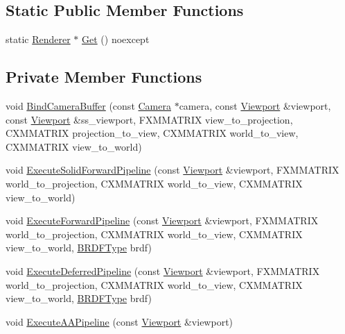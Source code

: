 \subsection*{Static Public Member Functions}
\begin{DoxyCompactItemize}
\item 
static \hyperlink{classmage_1_1_renderer}{Renderer} $\ast$ \hyperlink{classmage_1_1_renderer_a401f8e17f60d8546b30de22943ac35db}{Get} () noexcept
\end{DoxyCompactItemize}
\subsection*{Private Member Functions}
\begin{DoxyCompactItemize}
\item 
void \hyperlink{classmage_1_1_renderer_a7e303935e21196e28305cf4676128703}{Bind\+Camera\+Buffer} (const \hyperlink{classmage_1_1_camera}{Camera} $\ast$camera, const \hyperlink{classmage_1_1_viewport}{Viewport} \&viewport, const \hyperlink{classmage_1_1_viewport}{Viewport} \&ss\+\_\+viewport, F\+X\+M\+M\+A\+T\+R\+IX view\+\_\+to\+\_\+projection, C\+X\+M\+M\+A\+T\+R\+IX projection\+\_\+to\+\_\+view, C\+X\+M\+M\+A\+T\+R\+IX world\+\_\+to\+\_\+view, C\+X\+M\+M\+A\+T\+R\+IX view\+\_\+to\+\_\+world)
\item 
void \hyperlink{classmage_1_1_renderer_a32a06dca63b1c842ffb92007ca8144a9}{Execute\+Solid\+Forward\+Pipeline} (const \hyperlink{classmage_1_1_viewport}{Viewport} \&viewport, F\+X\+M\+M\+A\+T\+R\+IX world\+\_\+to\+\_\+projection, C\+X\+M\+M\+A\+T\+R\+IX world\+\_\+to\+\_\+view, C\+X\+M\+M\+A\+T\+R\+IX view\+\_\+to\+\_\+world)
\item 
void \hyperlink{classmage_1_1_renderer_a37abb92510abee24538a556d0ef6c0c2}{Execute\+Forward\+Pipeline} (const \hyperlink{classmage_1_1_viewport}{Viewport} \&viewport, F\+X\+M\+M\+A\+T\+R\+IX world\+\_\+to\+\_\+projection, C\+X\+M\+M\+A\+T\+R\+IX world\+\_\+to\+\_\+view, C\+X\+M\+M\+A\+T\+R\+IX view\+\_\+to\+\_\+world, \hyperlink{namespacemage_ae7a7a03a7b34d7e2689689bb8295cd38}{B\+R\+D\+F\+Type} brdf)
\item 
void \hyperlink{classmage_1_1_renderer_a2a218f2947b17b5ebec1d49ff5ec194e}{Execute\+Deferred\+Pipeline} (const \hyperlink{classmage_1_1_viewport}{Viewport} \&viewport, F\+X\+M\+M\+A\+T\+R\+IX world\+\_\+to\+\_\+projection, C\+X\+M\+M\+A\+T\+R\+IX world\+\_\+to\+\_\+view, C\+X\+M\+M\+A\+T\+R\+IX view\+\_\+to\+\_\+world, \hyperlink{namespacemage_ae7a7a03a7b34d7e2689689bb8295cd38}{B\+R\+D\+F\+Type} brdf)
\item 
void \hyperlink{classmage_1_1_renderer_a30e9ae9fb0d9cd0f105f0fb2181d34b1}{Execute\+A\+A\+Pipeline} (const \hyperlink{classmage_1_1_viewport}{Viewport} \&viewport)
\end{DoxyCompactItemize}
